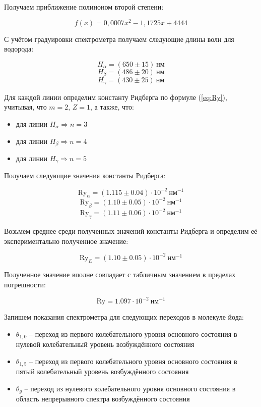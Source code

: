         Получаем приближение полиноном второй степени: 
        
        \[ f(x) = 0,0007x^{2} -1,1725x + 4444 \]


		С учётом градуировки спектрометра получаем следующие длины волн для водорода: 
        
		
		\[	H_{\alpha} = (650\pm 15)\ \text{нм} \]
        \[  H_{\beta} = (486\pm 20)\ \text{нм} \] 
        \[  H_{\gamma} = (430\pm  25)\  \text{нм} \]
		
		
		Для каждой линии определим константу Ридберга по формуле (\ref{eq:Ry}), учитывая, что $m=2$, $Z=1$, а также, что:
        
        \newpage

        \begin{itemize}
            \item для линии $H_{\alpha} \Rightarrow n=3$
            \item для линии $H_{\beta}  \Rightarrow n=4$
            \item для линии $H_{\gamma} \Rightarrow n=5$
        \end{itemize}
        Получаем следующие значения константы Ридберга:
		
	    \[ \text{Ry}_{\alpha}=(1.115\pm 0.04) \cdot 10^{-2} \ \text{нм}^{-1} \] 
        \[ \text{Ry}_{\beta} =(1.10\pm 0.05)\cdot 10^{-2} \ \text{нм}^{-1} \] 
        \[ \text{Ry}_{\gamma}=(1.11\pm 0.06)\cdot 10^{-2}\ \text{нм}^{-1} \]
		
	
		Возьмем среднее среди полученных значений константы Ридберга и определим её экспериментально полученное значение:
		
		\[ \text{Ry}_E=(1.10\pm 0.05)\cdot 10^{-2} ~\text{нм}^{-1} \]

		Полученное значение вполне совпадает с табличным значением в пределах погрешности:

		\[ \text{Ry}=1.097\cdot 10^{-2} \ \text{нм}^{-1} \]
		
		Запишем показания спектрометра для следующих переходов в молекуле йода: 
        \begin{itemize}
            \item $\theta_{1,0}$ -- переход из первого колебательного уровня основного состояния в нулевой колебательный уровень возбуждённого состояния
            \item $\theta_{1,5}$ -- переход из первого колебательного уровня основного состояния в пятый колебательный уровень возбуждённого состояния
            \item $\theta_{g}$ -- переход из нулевого колебательного уровня основного состояния в область непрерывного спектра возбуждённого состояния
        \end{itemize}
        
